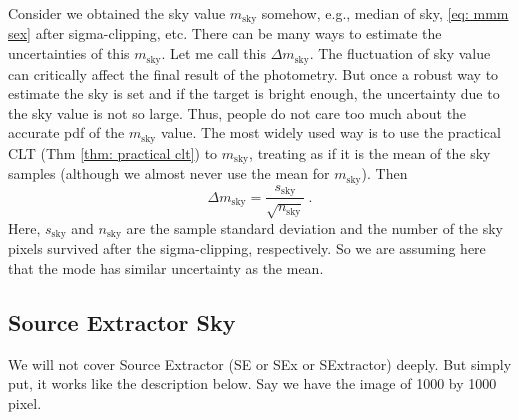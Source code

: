 Consider we obtained the sky value $ m_\mathrm{sky} $ somehow, e.g., median of sky, \cref{eq: mmm sex} after sigma-clipping, etc. There can be many ways to estimate the uncertainties of this $ m_\mathrm{sky} $. Let me call this $ \Delta m_\mathrm{sky} $. The fluctuation of sky value can critically affect the final result of the photometry. But once a robust way to estimate the sky is set and if the target is bright enough, the uncertainty due to the sky value is not so large. Thus, people do not care too much about the accurate pdf of the $ m_\mathrm{sky} $ value. The most widely used way is to use the practical CLT (Thm \ref{thm: practical clt}) to $ m_\mathrm{sky} $, treating as if it is the mean of the sky samples (although we almost never use the mean for $ m_\mathrm{sky} $). Then
\begin{equation}\label{eq: err m_sky}
  \Delta m_\mathrm{sky} = \frac{s_\mathrm{sky}}{\sqrt{n_\mathrm{sky}}} ~.
\end{equation}
Here, $ s_\mathrm{sky} $ and $ n_\mathrm{sky} $ are the sample standard deviation and the number of the sky pixels survived after the sigma-clipping, respectively. So we are assuming here that the mode has similar uncertainty as the mean.




\subsection{Source Extractor Sky}
We will not cover Source Extractor (SE or SEx or SExtractor) deeply. But simply put, it works like the description below. Say we have the image of 1000 by 1000 pixel.

